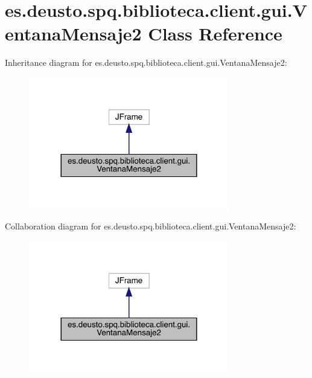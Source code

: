 \hypertarget{classes_1_1deusto_1_1spq_1_1biblioteca_1_1client_1_1gui_1_1_ventana_mensaje2}{}\section{es.\+deusto.\+spq.\+biblioteca.\+client.\+gui.\+Ventana\+Mensaje2 Class Reference}
\label{classes_1_1deusto_1_1spq_1_1biblioteca_1_1client_1_1gui_1_1_ventana_mensaje2}


Inheritance diagram for es.\+deusto.\+spq.\+biblioteca.\+client.\+gui.\+Ventana\+Mensaje2\+:
\nopagebreak
\begin{figure}[H]
\begin{center}
\leavevmode
\includegraphics[width=248pt]{classes_1_1deusto_1_1spq_1_1biblioteca_1_1client_1_1gui_1_1_ventana_mensaje2__inherit__graph}
\end{center}
\end{figure}


Collaboration diagram for es.\+deusto.\+spq.\+biblioteca.\+client.\+gui.\+Ventana\+Mensaje2\+:
\nopagebreak
\begin{figure}[H]
\begin{center}
\leavevmode
\includegraphics[width=248pt]{classes_1_1deusto_1_1spq_1_1biblioteca_1_1client_1_1gui_1_1_ventana_mensaje2__coll__graph}
\end{center}
\end{figure}
